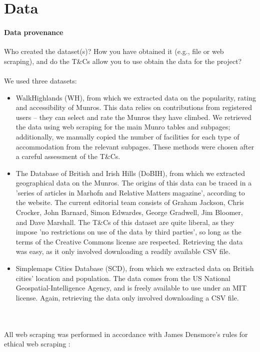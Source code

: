 \documentclass[11pt,a4paper]{article}
\begin{document}
\section{Data}

\paragraph{Data provenance} Who created the dataset(s)?  How you have
obtained it (e.g., file or web scraping), and do the T\&Cs allow you
to use obtain the data for the project? \\ \\
We used three datasets: 
\begin{itemize}
    \item WalkHighlands (WH), from which we extracted data on the popularity, rating and accessibility of Munros. This data relies on contributions from registered users – they can select and rate the Munros they have climbed. We retrieved the data using web scraping for the main Munro tables and subpages; additionally, we manually copied the number of facilities for each type of accommodation from the relevant subpages. These methods were chosen after a careful assessment of the T\&Cs.
    \item The Database of British and Irish Hills (DoBIH), from which we extracted geographical data on the Munros. The origins of this data can be traced in a 'series of articles in Marhofn and Relative Matters magazine', according to the website. The current editorial team consists of Graham Jackson, Chris Crocker, John Barnard, Simon Edwardes, George Gradwell, Jim Bloomer, and Dave Marshall. The T\&Cs of this dataset are quite liberal, as they impose 'no restrictions on use of the data by third parties', so long as the terms of the Creative Commons license are respected. Retrieving the data was easy, as it only involved downloading a readily available CSV file.
    \item Simplemaps Cities Database (SCD), from which we extracted data on British cities' location and population. The data comes from the US National Geospatial-Intelligence Agency, and is freely available to use under an MIT license. Again, retrieving the data only involved downloading a CSV file.
\end{itemize} \\ \\
All web scraping was performed in accordance with James Densmore's rules for ethical web scraping \cite{EiWS}:
\end{document}
